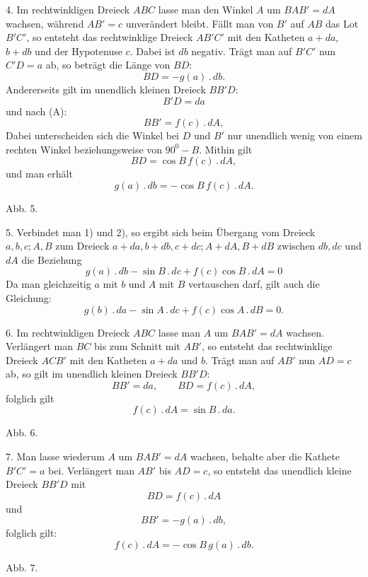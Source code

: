 %
4. Im rechtwinkligen Dreieck $ABC$ lasse man den Winkel $A$ um $BAB' = dA$
wachsen, während $AB' = c$ unverändert bleibt. Fällt man von $B'$ auf $AB$ das
Lot $B'C'$, so entsteht das rechtwinklige Dreieck $AB'C'$ mit den Katheten $a+da$,
$b+db$ und der Hypotenuse $c$. Dabei ist $db$ negativ. Trägt man auf
$B'C'$ nun $C'D = a$ ab, so beträgt die Länge von $BD$:
\[
BD = -g(a) \,.\, db.
\]
Andererseits gilt im unendlich kleinen Dreieck $BB'D$:
\[
B'D = da
\]
und nach (A):
\[
BB' = f(c) \,.\, dA,
\]
Dabei unterscheiden sich die Winkel bei $D$ und $B'$ nur unendlich wenig
von einem rechten Winkel beziehungsweise von $90^{0} - B$. Mithin gilt
\[
BD = \cos B\, f(c) \,.\, dA,
\]
und man erhält
\[
\tag*{2)} g(a) \,.\, db = -\cos B\, f(c) \,.\, dA.
\]

\begin{center}\begin{minipage}{\linewidth}\centering


Abb. 5.
\end{minipage}\end{center}

5. Verbindet man 1) und 2), so ergibt sich beim Übergang vom Dreieck
$a, b, c; A, B$ zum Dreieck $a+da, b+db, c+dc; A+dA, B+dB$ zwischen $db, dc$ und $dA$ die Beziehung
\[
\tag*{I.} g(a) \,.\, db - \sin B \,.\, dc + f(c) \cos B \,.\, dA = 0
\]
Da man gleichzeitig $a$ mit $b$ und $A$ mit $B$ vertauschen darf,
gilt auch die Gleichung:
\[
\tag*{II.} g(b) \,.\, da - \sin A \,.\, dc + f(c) \cos A \,.\, dB = 0.
\]

6. Im rechtwinkligen Dreieck $ABC$ lasse man $A$ um $BAB' = dA$ wachsen.
Verlängert man $BC$ bis zum Schnitt mit $AB'$, so entsteht das rechtwinklige
Dreieck $ACB'$ mit den Katheten $a+da$ und $b$. Trägt man auf $AB'$ nun
$AD = c$ ab, so gilt im unendlich kleinen Dreieck $BB'D$:
\[
BB' = da, \qquad BD = f(c) \,.\, dA,
\]
folglich gilt
\[
\tag*{3)} f(c) \,.\, dA = \sin B \,.\, da.
\]

\begin{center}\begin{minipage}{\linewidth}\centering


Abb. 6.
\end{minipage}\end{center}

7. Man lasse wiederum $A$ um $BAB' = dA$ wachsen, behalte aber die Kathete
$B'C' = a$ bei. Verlängert man $AB'$ bis $AD = c$, so entsteht das unendlich kleine
Dreieck $BB'D$ mit
\[
BD = f(c) \,.\, dA
\]
und
\[
BB' = -g(a) \,.\, db,
\]
folglich gilt:
\[
\tag*{4)} f(c) \,.\, dA = -\cos B\, g(a) \,.\, db.
\]

\begin{center}\begin{minipage}{\linewidth}\centering


Abb. 7.
\end{minipage}\end{center}
